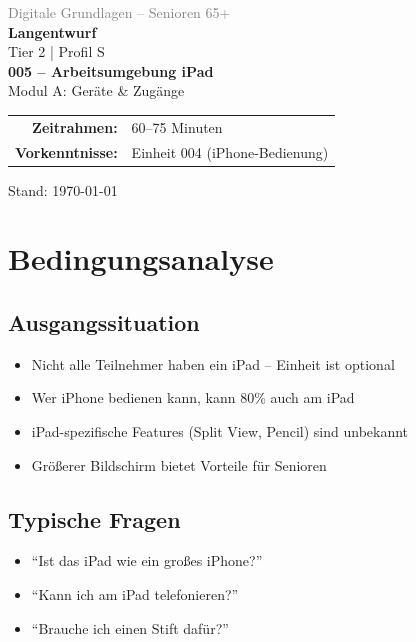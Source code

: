 \documentclass[11pt,a4paper]{article}
\begin{document}
\begin{titlepage}
    \centering
    \vspace*{2cm}
    {\Large\textcolor{gray}{Digitale Grundlagen -- Senioren 65+}}\\[2cm]
    {\Huge\textcolor{fach}{\textbf{Langentwurf}}}\\[0.5cm]
    {\large Tier 2 | Profil S}\\[2cm]
    {\LARGE\textbf{005 -- Arbeitsumgebung iPad}}\\[0.5cm]
    {\large Modul A: Geräte \& Zugänge}\\[2cm]
    \begin{tabular}{rl}
        \textbf{Zeitrahmen:} & 60--75 Minuten \\
        \textbf{Vorkenntnisse:} & Einheit 004 (iPhone-Bedienung) \\
    \end{tabular}
    \vfill
    {\normalsize Stand: \today}
\end{titlepage}

\tableofcontents
\newpage

\section{Bedingungsanalyse}

\subsection{Ausgangssituation}
\begin{itemize}
    \item Nicht alle Teilnehmer haben ein iPad -- Einheit ist optional
    \item Wer iPhone bedienen kann, kann 80\% auch am iPad
    \item iPad-spezifische Features (Split View, Pencil) sind unbekannt
    \item Größerer Bildschirm bietet Vorteile für Senioren
\end{itemize}

\subsection{Typische Fragen}
\begin{itemize}
    \item ``Ist das iPad wie ein großes iPhone?''
    \item ``Kann ich am iPad telefonieren?''
    \item ``Brauche ich einen Stift dafür?''
\end{itemize}
\end{document}
